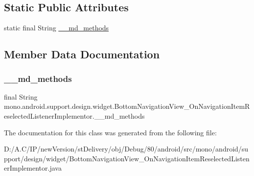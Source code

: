 \subsection*{Static Public Attributes}
\begin{DoxyCompactItemize}
\item 
static final String \hyperlink{classmono_1_1android_1_1support_1_1design_1_1widget_1_1_bottom_navigation_view___on_navigation_ibc61d53e910ce9033a3261f22503637c_a41a4daa4812cd7f025a550d0e1ceb2db}{\+\_\+\+\_\+md\+\_\+methods}
\end{DoxyCompactItemize}


\subsection{Member Data Documentation}
\mbox{\label{classmono_1_1android_1_1support_1_1design_1_1widget_1_1_bottom_navigation_view___on_navigation_ibc61d53e910ce9033a3261f22503637c_a41a4daa4812cd7f025a550d0e1ceb2db}} 
\subsubsection{\texorpdfstring{\+\_\+\+\_\+md\+\_\+methods}{\_\_md\_methods}}
{\footnotesize\ttfamily final String mono.\+android.\+support.\+design.\+widget.\+Bottom\+Navigation\+View\+\_\+\+On\+Navigation\+Item\+Reselected\+Listener\+Implementor.\+\_\+\+\_\+md\+\_\+methods\hspace{0.3cm}{\ttfamily [static]}}



The documentation for this class was generated from the following file\+:\begin{DoxyCompactItemize}
\item 
D\+:/\+A.\+C/\+I\+P/new\+Version/st\+Delivery/obj/\+Debug/80/android/src/mono/android/support/design/widget/Bottom\+Navigation\+View\+\_\+\+On\+Navigation\+Item\+Reselected\+Listener\+Implementor.\+java\end{DoxyCompactItemize}

